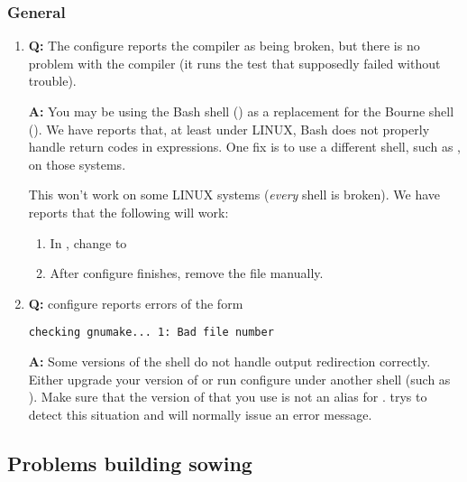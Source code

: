 \documentclass[11pt,twoside]{article}
\def\question{{\bf Q: }}
\def\answer{{\bf A: }}
\begin{document}
\subsubsection{General}
\begin{enumerate}

\item 
\question 
The configure reports the compiler as being broken, but there is
no problem with the compiler (it runs the test that supposedly failed without
trouble).

\answer 
You may be using the Bash shell () as a replacement for
the Bourne shell ().  We have reports that, at least under
LINUX, Bash does not properly handle return codes in expressions.  One fix is
to use a different shell, such as , on those systems.

This won't work on some LINUX systems ({\em every} shell is broken).  We have
reports that the following will work:
\begin{enumerate}
\item In , change  to 
\item After configure finishes, remove the file  manually.
\end{enumerate}

\item 
\question 
configure reports errors of the form
\begin{verbatim} 
checking gnumake... 1: Bad file number
\end{verbatim}

\answer 
Some versions of the  shell do not handle output redirection
correctly.  Either upgrade your version of  or run configure under
another shell (such as ).  Make sure that the version of
 that you use is not an alias for .   
trys to detect this situation and will normally issue an error message.

\end{enumerate}

\subsection{Problems building \texorpdfstring{sowing}{\texttt{sowing}}}
\end{document}
